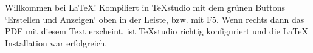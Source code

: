 \documentclass[11pt]{scrbook}
\begin{document}
Willkommen bei LaTeX! Kompiliert in TeXstudio mit dem grünen Buttons `Erstellen und Anzeigen` oben in der Leiste, bzw. mit F5. Wenn rechts dann das PDF mit diesem Text erscheint, ist TeXstudio richtig konfiguriert und die LaTeX Installation war erfolgreich.
\end{document}
